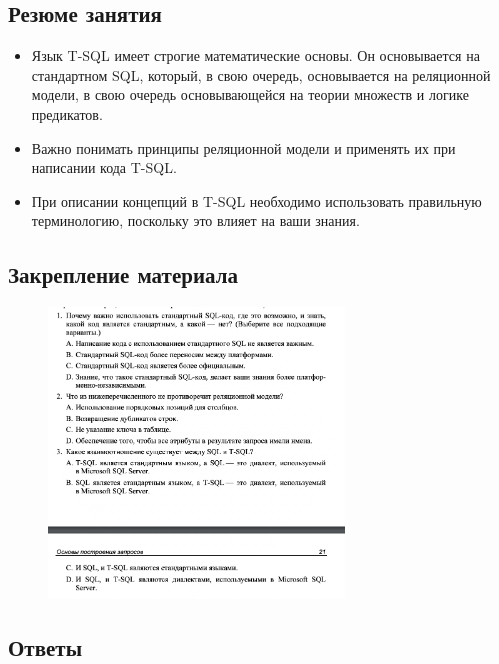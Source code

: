 \subsection*{Резюме занятия}
\begin{itemize}
	\item Язык T-SQL имеет строгие математические основы. Он основывается на стандартном SQL, который, в свою очередь, основывается на реляционной модели,
	в свою очередь основывающейся на теории множеств и логике предикатов.
	\item Важно понимать принципы реляционной модели и применять их при написании
	кода T-SQL. 
	\item При описании концепций в T-SQL необходимо использовать правильную терминологию, поскольку это влияет на ваши знания. 
\end{itemize}

\subsection*{Закрепление материала}

\begin{figure}[h!]
	\begin{center}
		\includegraphics[width=0.7\textwidth]{img/zakrep1.png}
	\end{center}
	\captionsetup{justification=centering}
\end{figure}

\subsection*{Ответы}

